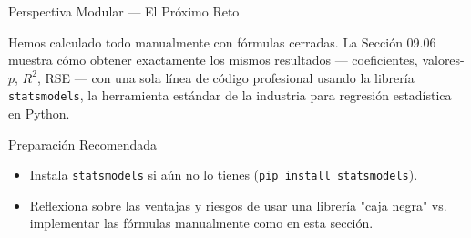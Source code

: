 \documentclass[10pt, aspectratio=169]{beamer}
\begin{document}
\begin{frame}{Perspectiva Modular --- El Próximo Reto}
  \scriptsize
  \begin{retoclase}
    Hemos calculado todo manualmente con fórmulas cerradas. La Sección 09.06 muestra cómo obtener exactamente los mismos resultados --- coeficientes, valores-$p$, $R^2$, RSE --- con una sola línea de código profesional usando la librería \texttt{statsmodels}, la herramienta estándar de la industria para regresión estadística en Python.
  \end{retoclase}

  \vspace{0.08cm}
  \pause
  \begin{alertblock}{Preparación Recomendada}
    \begin{itemize}\itemsep=0.06cm
      \item Instala \texttt{statsmodels} si aún no lo tienes (\texttt{pip install statsmodels}).
      \item Reflexiona sobre las ventajas y riesgos de usar una librería "caja negra" vs. implementar las fórmulas manualmente como en esta sección.
    \end{itemize}
  \end{alertblock}
\end{frame}
\end{document}

